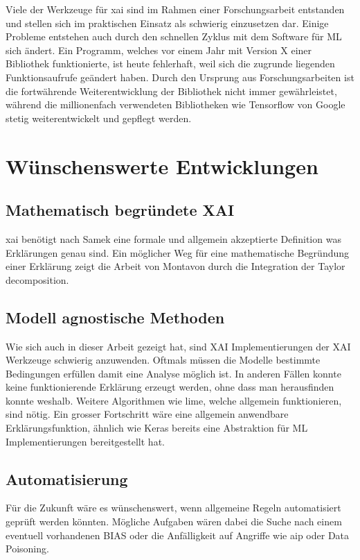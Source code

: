\documentclass[
  12pt, %
  a4paper, %
  oneside, %
  openany, 
  numbers=noenddot, %
  BCOR=5mm, %
  parskip=half*, %
  thesis, %
]{bfhbook}
\begin{document}
Viele der Werkzeuge für \Gls{xai} sind im Rahmen einer Forschungsarbeit entstanden und stellen sich im praktischen Einsatz als schwierig einzusetzen dar. Einige Probleme entstehen auch durch den schnellen Zyklus mit dem Software für \Gls{ML} sich ändert. Ein Programm, welches vor einem Jahr mit Version X einer Bibliothek funktionierte, ist heute fehlerhaft, weil sich die zugrunde liegenden Funktionsaufrufe geändert haben. Durch den Ursprung aus Forschungsarbeiten ist die fortwährende Weiterentwicklung der Bibliothek nicht immer gewährleistet, während die millionenfach verwendeten Bibliotheken wie Tensorflow von Google stetig weiterentwickelt und gepflegt werden.

\section{Wünschenswerte Entwicklungen}

\subsection{Mathematisch begründete XAI}
\Gls{xai} benötigt nach Samek \parencite{Samek2019a} eine formale und allgemein akzeptierte Definition was Erklärungen genau sind.
Ein möglicher Weg für eine mathematische Begründung einer Erklärung zeigt die Arbeit von Montavon \parencite{Montavon2017} durch die Integration der Taylor decomposition.

\subsection{Modell agnostische Methoden}
Wie sich auch in dieser Arbeit gezeigt hat, sind \acrshort{XAI} Implementierungen der XAI Werkzeuge schwierig anzuwenden. Oftmals müssen die Modelle bestimmte Bedingungen erfüllen damit eine Analyse möglich ist. In anderen Fällen konnte keine funktionierende Erklärung erzeugt werden, ohne dass man herausfinden konnte weshalb. Weitere Algorithmen wie \acrshort{lime}, welche allgemein funktionieren, sind nötig. Ein grosser Fortschritt wäre eine allgemein anwendbare Erklärungsfunktion, ähnlich wie Keras bereits eine Abstraktion für \Gls{ML} Implementierungen bereitgestellt hat. 

\subsection{Automatisierung}
Für die Zukunft wäre es wünschenswert, wenn allgemeine Regeln automatisiert geprüft werden könnten. Mögliche Aufgaben wären dabei die Suche nach einem eventuell vorhandenen \Gls{BIAS} oder die Anfälligkeit auf Angriffe wie \acrlong{aip} oder Data Poisoning.
\end{document}

